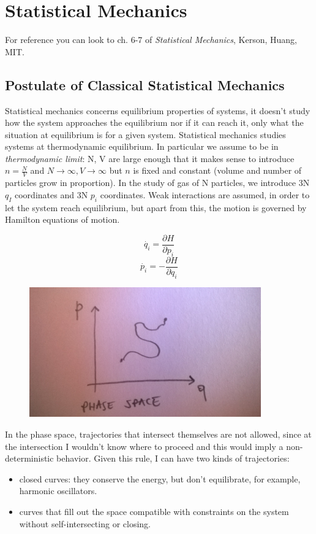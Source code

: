 \documentclass[a4paper, italian, openany]{book}
\begin{document}
\tableofcontents

\chapter{Statistical Mechanics}

For reference you can look to ch. 6-7 of \textit{Statistical Mechanics}, Kerson, Huang, MIT.

\section{Postulate of Classical Statistical Mechanics}

Statistical mechanics concerns equilibrium properties of systems, it doesn't study how the system approaches the equilibrium nor if it can reach it, only what the situation at equilibrium is for a given system.\newline
Statistical mechanics studies systems at thermodynamic equilibrium. In particular we assume to be in \textit{thermodynamic limit}: N, V are large enough that it makes sense to introduce $n = \frac{N}{V}$ and $N \rightarrow \infty, V \rightarrow \infty$ but $n$ is fixed and constant (volume and number of particles grow in proportion).\newline
In the study of gas of N particles, we introduce 3N $q_I$ coordinates and 3N $p_i$ coordinates. Weak interactions are assumed, in order to let the system reach equilibrium, but apart from this, the motion is governed by Hamilton equations of motion.

$$\dot{q_i} = \frac{\partial H}{\partial p_i}$$
$$\dot{p_i} = - \frac{\partial H}{\partial q_i}$$

\begin{figure}[H]
\centering
\includegraphics[width=100mm]{img/figure1.jpg}
\end{figure}

In the phase space, trajectories that intersect themselves are not allowed, since at the intersection I wouldn't know where to proceed and this would imply a non-deterministic behavior. Given this rule, I can have two kinds of trajectories:
\begin{itemize}
\item closed curves: they conserve the energy, but don't equilibrate, for example, harmonic oscillators.
\item curves that fill out the space compatible with constraints on the system without self-intersecting or closing.
\end{itemize}
\end{document}
